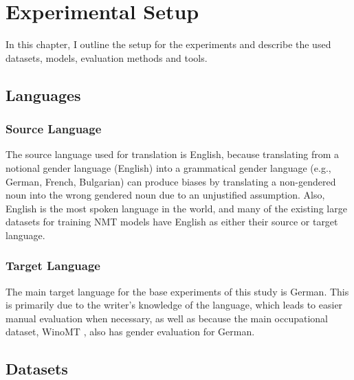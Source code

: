 \chapter{Experimental Setup}
\label{ch:Setup}

In this chapter, I outline the setup for the experiments and describe the used datasets, models, evaluation methods and tools.

\section{Languages}
\label{sec:Experiments:Languages}


\subsection{Source Language} 
The source language used for translation is English, because translating from a notional gender language (English) into a grammatical gender language (e.g., German, French, Bulgarian) can produce biases by translating a non-gendered noun into the wrong gendered noun due to an unjustified assumption. Also, English is the most spoken language in the world, and many of the existing large datasets for training NMT models have English as either their source or target language.

\subsection{Target Language} 
The main target language for the base experiments of this study is German. This is primarily due to the writer's knowledge of the language, which leads to easier manual evaluation when necessary, as well as because the main occupational dataset, WinoMT \parencite{Stanovsky_2019}, also has gender evaluation for German.


\section{Datasets}
\label{sec:Experiments:Datasets}

